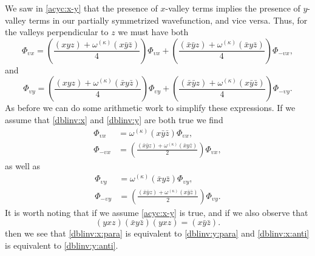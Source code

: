 We saw in \eqref{acyc:x-y} that the presence of $x$-valley terms implies the
presence of $y$-valley terms in our partially symmetrized wavefunction, and vice
versa. Thus, for the valleys perpendicular to $z$ we must have both
\begin{equation}
  \Phi_{\upsilon x}
  =
  \left(
    \frac
    {
      \left(xyz\right)
      +
      \omega^{\left(\kappa\right)}\left(x\bar{y}\bar{z}\right)
    }
    {4}
  \right)
  \Phi_{\upsilon x}
  +
  \left(
    \frac
    {
      \left(\bar{x}\bar{y}z\right)
      +
      \omega^{\left(\kappa\right)}\left(\bar{x}y\bar{z}\right)
    }
    {4}
  \right)
  \Phi_{-\upsilon x}
  ,
\label{dblinv:x}
\end{equation}
and
\begin{equation}
  \Phi_{\upsilon y}
  =
  \left(
    \frac
    {
      \left(xyz\right)
      +
      \omega^{\left(\kappa\right)}\left(\bar{x}y\bar{z}\right)
    }
    {4}
  \right)
  \Phi_{\upsilon y}
  +
  \left(
    \frac
    {
      \left(\bar{x}\bar{y}z\right)
      +
      \omega^{\left(\kappa\right)}\left(x\bar{y}\bar{z}\right)
    }
    {4}
  \right)
  \Phi_{-\upsilon y}
  .
\label{dblinv:y}
\end{equation}
As before we can do some arithmetic work to simplify these expressions. If we
assume that \eqref{dblinv:x} and \eqref{dblinv:y} are both true we find
\begin{align}
  \Phi_{\upsilon x}
  & =
  \omega^{\left(\kappa\right)}
  \left(x\bar{y}\bar{z}\right)
  \Phi_{\upsilon x}
  ,
\label{dblinv:x:para}
\\
  \Phi_{-\upsilon x}
  & =
  \left(
    \frac
    {
      \left(\bar{x}\bar{y}z\right)
      +
      \omega^{\left(\kappa\right)}\left(\bar{x}y\bar{z}\right)
    }
    {2}
  \right)
  \Phi_{\upsilon x}
  ,
\label{dblinv:x:anti}
\end{align}
as well as
\begin{align}
  \Phi_{\upsilon y}
  & =
  \omega^{\left(\kappa\right)}
  \left(\bar{x}y\bar{z}\right)
  \Phi_{\upsilon y}
  ,
\label{dblinv:y:para}
\\
  \Phi_{-\upsilon y}
  & =
  \left(
    \frac
    {
      \left(\bar{x}\bar{y}z\right)
      +
      \omega^{\left(\kappa\right)}\left(x\bar{y}\bar{z}\right)
    }
    {2}
  \right)
  \Phi_{\upsilon y}
  .
\label{dblinv:y:anti}
\end{align}
It is worth noting that if we assume \eqref{acyc:x-y} is true, and if we also
observe that
\begin{equation}
\left(yxz\right)\left(\bar{x}y\bar{z}\right)\left(yxz\right)
  =
    \left(x\bar{y}\bar{z}\right)
.
\end{equation}
then we see that \eqref{dblinv:x:para} is equivalent to \eqref{dblinv:y:para}
and \eqref{dblinv:x:anti} is equivalent to \eqref{dblinv:y:anti}.

